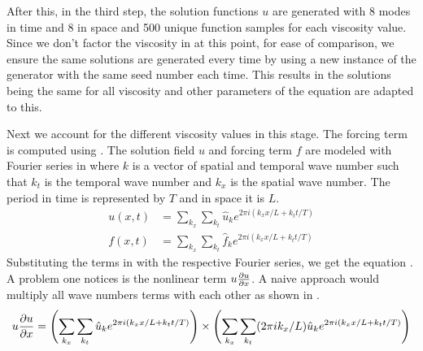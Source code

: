 After this, in the third step, the solution functions \(u \) are generated with 8 modes in time and 8 in space and \num{500} unique function samples for each viscosity value. Since we don't factor the viscosity in at this point, for ease of comparison, we ensure the same solutions are generated every time by using a new instance of the generator with the same seed number each time. This results in the solutions being the same for all viscosity and other parameters of the equation are adapted to this.

Next we account for the different viscosity values in this stage. The forcing term is computed using . The solution field \(u\) and forcing term \(f\) are modeled with Fourier series in  where \(k\) is a vector of spatial and temporal wave number such that \(k_t\) is the temporal wave number and \(k_x\) is the spatial wave number. The period in time is represented by \(T\) and in space it is \(L\).
\begin{align}
  u\left(x, t \right) & = \sum_{k_{x}} \sum_{k_{t}} \hat{u}_k e^{2\pi i(k_{x}x/L+k_{t}t/T)} \label{eq:fourier_field} \\
  f\left(x, t \right) & = \sum_{k_{x}}\sum_{k_{t}} \hat{f}_k e^{2\pi i(k_{x}x/L+k_{t}t/T)} \label{eq:fourier_force}
\end{align}
Substituting the terms in  with the respective Fourier series, we get the equation . A problem one notices is the nonlinear term \(u\pdv{u}{x}\). A naive approach would multiply all wave numbers terms with each other as shown in .
\begin{align}
  u\pdv{u}{x} = \left(\sum_{k_{x}} \sum_{k_{t}} \hat{u}_k e^{2\pi i(k_{x}x/L+k_{t}t/T)}\right) \times \left(\sum_{k_{x}} \sum_{k_{t}} (2\pi i k_{x}/L)\hat{u}_k e^{2\pi i(k_{x}x/L+k_{t}t/T)}\right)\label{eq:burgers_convolution}
\end{align}

